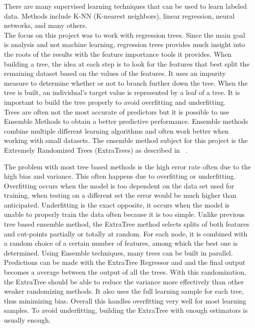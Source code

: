 \documentclass[a4paper,11pt]{report}
\numberwithin{figure}{chapter} %
\begin{document}
    There are many supervised learning techniques that can be used to learn labeled data.
    Methods include K-NN (K-nearest neighbors), linear regression, neural networks, and many others.\\

    The focus on this project was to work with regression trees.
    Since the main goal is analysis and not machine learning, regression trees provides much insight into the roots of the results with the feature importance tools it provides.
    When building a tree, the idea at each step is to look for the features that best split the remaining dataset based on the values of the features.
    It uses an impurity measure to determine whether or not to branch further down the tree.
    When the tree is built, an individual's target value is represented by a leaf of a tree.
    It is important to build the tree properly to avoid overfitting and underfitting.\\

    Trees are often not the most accurate of predictors but it is possible to use Ensemble Methods to obtain a better predictive performance.
    Ensemble methods combine multiple different learning algorithms and often work better when working with small datasets.
    The ensemble method subject for this project is the Extremely Randomized Trees (ExtraTrees) as described in ~\cite{extratree}.

    The problem with most tree based methods is the high error rate often due to the high bias and variance.
    This often happens due to overfitting or underfitting.
    Overfitting occurs when the model is too dependent on the data set used for training, when testing on a different set the error would be much higher than anticipated.
    Underfitting is the exact opposite, it occurs when the model is unable to properly train the data often because it is too simple.
    Unlike previous tree based ensemble method, the ExtraTree method selects splits of both features and cut-points partially or totally at random.
    For each node, it is combined with a random choice of a certain number of features, among which the best one is determined.
    Using Ensemble techniques, many trees can be built in parallel.
    Predictions can be made with the ExtraTree Regressor and and the final output becomes a average between the output of all the trees.
    With this randomization, the ExtraTree should be able to reduce the variance more effectively than other weaker randomizing methods.
    It also uses the full learning sample for each tree, thus minimizing bias.
    Overall this handles overfitting very well for most learning samples.
    To avoid underfitting, building the ExtraTree with enough estimators is usually enough.\\
\end{document}
